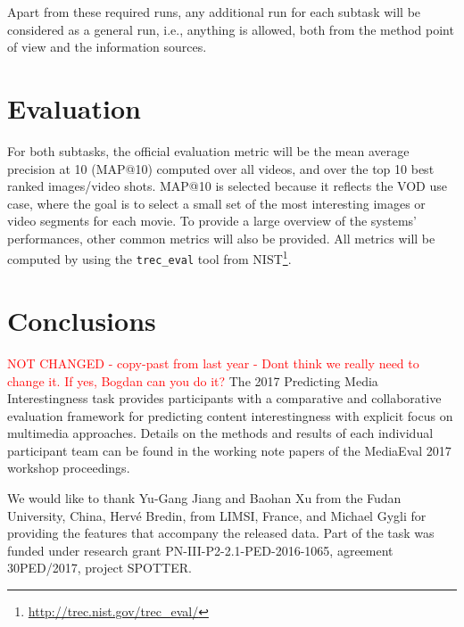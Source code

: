 \documentclass[sigconf]{acmart-me}
\begin{document}
Apart from these required runs, any additional run for each subtask will be considered as a general run, i.e., anything is allowed, both from the method point of view and the information sources. 

\section{Evaluation}

For both subtasks, the official evaluation metric will be the mean average precision at 10 (MAP@10) computed over all videos, and over the top 10 best ranked images/video shots. MAP@10 is selected because it reflects the VOD use case, where the goal is to select a small set of the most interesting images or video segments for each movie. To provide a large overview of the systems' performances, other common metrics will also be provided. All metrics will be computed by using the \texttt{trec\_eval} tool from
NIST\footnote{\url{http://trec.nist.gov/trec\_eval/}}.

\section{Conclusions}
\textcolor{red}{NOT CHANGED - copy-past from last year - Dont think we really need to change it. If yes, Bogdan can you do it?}
The 2017 Predicting Media Interestingness task provides participants
with a comparative and collaborative evaluation framework for
predicting content interestingness with explicit focus on
multimedia approaches. Details on the methods and results of each individual
participant team can be found in the working note papers of the
MediaEval 2017 workshop proceedings.

\begin{acks}
We would like to thank Yu-Gang Jiang and Baohan Xu
from the Fudan University, China, Herv\'{e} Bredin, from LIMSI,
France, and Michael Gygli for providing the features that accompany the
released data. Part of the task was funded under research grant PN-III-P2-2.1-PED-2016-1065, agreement 30PED/2017, project SPOTTER.
\end{acks}



\def\bibfont{\small} %

\end{document}
